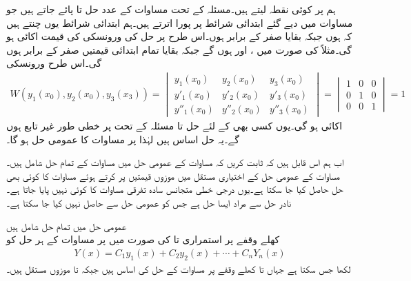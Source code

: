 ہم  پر کوئی نقطہ  لیتے ہیں۔مسئلہ  کے تحت مساوات  کے  عدد حل  تا  پائے جاتے ہیں جو مساوات  میں دیے گئے  ابتدائی شرائط پر پورا اترتے ہیں۔ہم ابتدائی شرائط یوں چنتے ہیں کہ  ہوں جبکہ بقایا  صفر کے برابر ہوں۔اس طرح  پر حل کی ورونسکی کی قیمت اکائی  ہو گی۔مثلاً  کی صورت میں  ،  اور  ہوں گے جبکہ بقایا تمام ابتدائی قیمتیں صفر کے برابر ہوں گی۔اس طرح ورونسکی
\begin{align*}
W(y_1(x_0),y_2(x_0),y_3(x_3))=
\begin{vmatrix}
y_1(x_0) & y_2(x_0) & y_3(x_0)\\
y'_1(x_0) & y'_2(x_0) & y'_3(x_0)\\
y''_1(x_0) & y''_2(x_0) & y''_3(x_0)
\end{vmatrix}
=
\begin{vmatrix}
1&0&0\\
0&1&0\\
0&0&1
\end{vmatrix}
=1
\end{align*}
اکائی ہو گی۔یوں کسی بھی  کے لئے  حل  تا  مسئلہ  کے تحت  پر خطی طور غیر تابع ہوں گے۔یہ حل اساس ہیں لہٰذا  پر مساوات  کا عمومی حل  ہو گا۔

اب ہم اس قابل ہیں کہ ثابت کریں کہ مساوات  کے عمومی حل میں مساوات  کے تمام حل شامل ہیں۔مساوات  کے عمومی حل کے اختیاری مستقل میں موزوں قیمتیں پر کرتے ہوئے مساوات   کا کوئی بھی حل حاصل کیا جا سکتا ہے۔یوں  درجی خطی متجانس سادہ تفرقی مساوات  کا کوئی  نہیں پایا جاتا ہے۔نادر حل سے مراد ایسا حل ہے جس کو عمومی حل سے حاصل نہیں کیا جا سکتا ہے۔ 

\quad عمومی حل میں تمام حل شامل ہیں\\
کھلے وقفے  پر استمراری  تا  کی صورت میں  پر مساوات  کے ہر حل  کو
\begin{align}
Y(x)=C_1y_1(x)+C_2y_2(x)+\cdots+C_nY_n(x)
\end{align}
لکھا جس سکتا ہے جہاں  تا  کھلے وقفے  پر مساوات   کے حل کی اساس ہیں جبکہ  تا  موزوں مستقل ہیں۔

